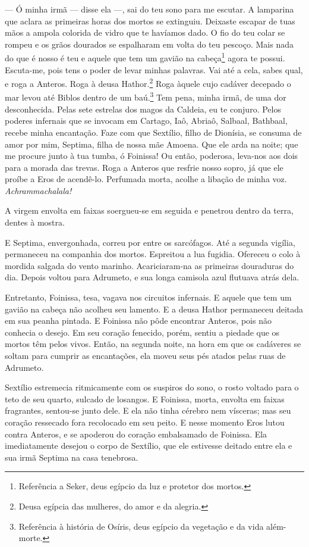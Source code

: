 --- Ó minha irmã --- disse ela ---, sai do teu sono para me escutar. A lamparina que \label{irma}
aclara as primeiras horas dos mortos se extinguiu. Deixaste escapar de
tuas mãos a ampola colorida de vidro que te havíamos dado. O fio do teu
colar se rompeu e os grãos dourados se espalharam em volta do teu pescoço.
Mais nada do que é nosso é teu e aquele que tem um gavião na
cabeça\footnote{ Referência a Seker, deus egípcio da luz e protetor dos mortos.} 
agora te possui. Escuta-me, pois tens o poder de levar
minhas palavras. Vai até a cela, sabes qual, e roga a Anteros. Roga à
deusa Hathor.\footnote{ Deusa egípcia das mulheres, do amor e da alegria.} 
Roga àquele cujo cadáver decepado o mar levou até Biblos dentro
de um baú.\footnote{ Referência à história de Osíris, deus egípcio da
vegetação e da vida além-morte.} Tem pena, minha irmã, de uma dor
desconhecida. Pelas sete estrelas dos magos da Caldeia, eu te conjuro.
Pelos poderes infernais que se invocam em Cartago, Iaô, Abriaô, Salbaal,
Bathbaal, recebe minha encantação. Faze com que Sextílio, filho de
Dionísia, se consuma de amor por mim, Septima, filha de nossa mãe Amoena.
Que ele arda na noite; que me procure junto à tua tumba, ó Foinissa! Ou
então, poderosa, leva-nos aos dois para a morada das trevas. Roga a
Anteros que resfrie nosso sopro, já que ele proíbe a Eros de acendê-lo.
Perfumada morta, acolhe a libação de minha voz. \textit{Achrammachalala!}

A virgem envolta em faixas soergueu-se em seguida e penetrou dentro da
terra, dentes à mostra.

E Septima, envergonhada, correu por entre os sarcófagos. Até a segunda
vigília, permaneceu na companhia dos mortos. Espreitou a lua fugidia.
Ofereceu o colo à mordida salgada do vento marinho. Acariciaram-na as
primeiras douraduras do dia. Depois voltou para Adrumeto, e sua longa
camisola azul flutuava atrás dela.

Entretanto, Foinissa, tesa, vagava nos circuitos infernais. E aquele que tem
um gavião na cabeça não acolheu seu lamento. E a deusa Hathor permaneceu
deitada em sua peanha pintada. E Foinissa não pôde encontrar Anteros, pois
não conhecia o desejo. Em seu coração fenecido, porém, sentiu a piedade
que os mortos têm pelos vivos. Então, na segunda noite, na hora em que os
cadáveres se soltam para cumprir as encantações, ela moveu seus pés atados
pelas ruas de Adrumeto.

Sextílio estremecia ritmicamente com os suspiros do sono, o rosto voltado
para o teto de seu quarto, sulcado de losangos. E Foinissa, morta, envolta \label{viscera}
em faixas fragrantes, sentou-se junto dele. E ela não tinha cérebro nem
vísceras; mas seu coração ressecado fora recolocado em seu peito. E nesse
momento Eros lutou contra Anteros, e se apoderou do coração embalsamado de
Foinissa. Ela imediatamente desejou o corpo de Sextílio, que ele estivesse
deitado entre ela e sua irmã Septima na casa tenebrosa.

